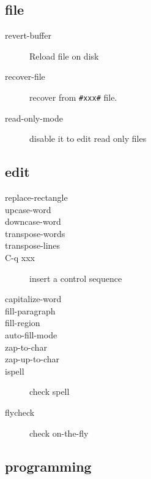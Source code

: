 \subsection{file}
\begin{description}
\item [revert-buffer] Reload file on disk
\item [recover-file] recover from \texttt{\#xxx\#} file.
\item [read-only-mode] disable it to edit read only files
\end{description}

\subsection{edit}

\begin{description}
\item [replace-rectangle]
\item [upcase-word]
\item [downcase-word]
\item [transpose-words]
\item [transpose-lines]
\item [C-q xxx] insert a control sequence
\item [capitalize-word]
\item [fill-paragraph]
\item [fill-region]
\item [auto-fill-mode]
\item [zap-to-char]
\item [zap-up-to-char]
\item [ispell] check spell 
\item [flycheck] check on-the-fly
\end{description}

\subsection{programming}

